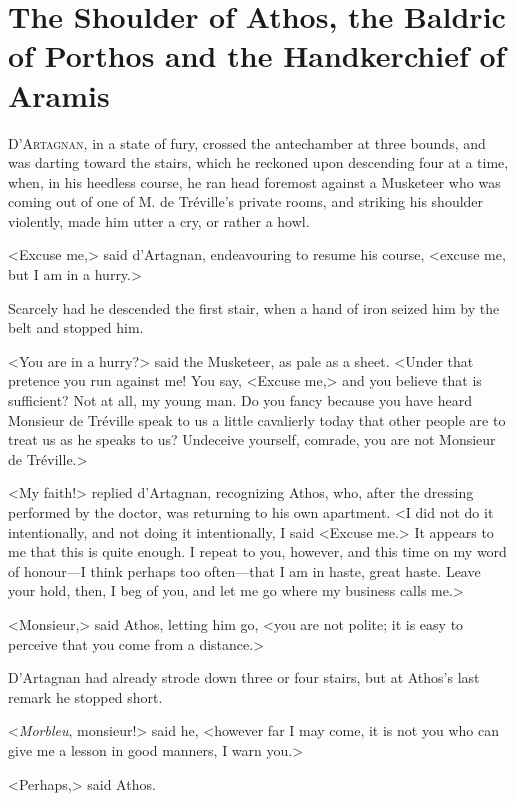 
\chapter{The Shoulder of Athos, the Baldric of Porthos and the Handkerchief of Aramis} 

\lettrine[]{D}{'Artagnan}, in a state of fury, crossed the antechamber at three bounds, and was darting toward the stairs, which he reckoned upon descending four at a time, when, in his heedless course, he ran head foremost against a Musketeer who was coming out of one of M. de Tréville's private rooms, and striking his shoulder violently, made him utter a cry, or rather a howl. 

<Excuse me,> said d'Artagnan, endeavouring to resume his course, <excuse me, but I am in a hurry.> 

Scarcely had he descended the first stair, when a hand of iron seized him by the belt and stopped him. 

<You are in a hurry?> said the Musketeer, as pale as a sheet. <Under that pretence you run against me! You say, <Excuse me,> and you believe that is sufficient? Not at all, my young man. Do you fancy because you have heard Monsieur de Tréville speak to us a little cavalierly today that other people are to treat us as he speaks to us? Undeceive yourself, comrade, you are not Monsieur de Tréville.> 

<My faith!> replied d'Artagnan, recognizing Athos, who, after the dressing performed by the doctor, was returning to his own apartment. <I did not do it intentionally, and not doing it intentionally, I said <Excuse me.> It appears to me that this is quite enough. I repeat to you, however, and this time on my word of honour---I think perhaps too often---that I am in haste, great haste. Leave your hold, then, I beg of you, and let me go where my business calls me.> 

<Monsieur,> said Athos, letting him go, <you are not polite; it is easy to perceive that you come from a distance.> 

D'Artagnan had already strode down three or four stairs, but at Athos's last remark he stopped short. 

<\textit{Morbleu}, monsieur!> said he, <however far I may come, it is not you who can give me a lesson in good manners, I warn you.> 

<Perhaps,> said Athos. 

